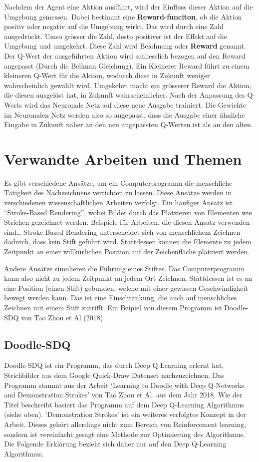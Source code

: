 Nachdem der Agent eine Aktion ausführt, wird der Einfluss dieser Aktion auf die
Umgebung gemessen. Dabei bestimmt eine \textbf{Reward-funciton}, ob die Aktion
positiv oder negativ auf die Umgebung wirkt. Das wird durch eine Zahl
ausgedrückt. Umso grösser die Zahl, desto positiver ist der Effekt auf die
Umgebung und umgekehrt. Diese Zahl wird Belohnung oder \textbf{Reward} genannt.
Der Q-Wert der ausgeführten Aktion wird schliesslich bezogen auf den Reward
angepasst (Durch die Bellman Gleichung). Ein Kleinerer Reward führt zu einem
kleineren Q-Wert für die Aktion, wodurch diese in Zukunft weniger wahrscheinlich
gewählt wird. Umgekehrt macht ein grösserer Reward die Aktion, die diesen
ausgelöst hat, in Zukunft wahrscheinlicher. Nach der Anpassung des Q-Werts wird
das Neuronale Netz auf diese neue Ausgabe trainiert. Die Gewichte im Neuronalen
Netz werden also so angepasst, dass die Ausgabe einer ähnliche Eingabe in
Zukunft näher an den neu angepassten Q-Werten ist als an den alten.

\section{Verwandte Arbeiten und Themen}
\label{chap:t_verwandt}
Es gibt verschiedene Ansätze, um ein Computerprogramm die menschliche Tätigkeit
des Nachzeichnens verrichten zu lassen. Diese Ansätze werden in verschiedenen
wissenschaftlichen Arbeiten verfolgt. Ein häufiger Ansatz ist ``Stroke-Based
Rendering'', wobei Bilder durch das Platzieren von Elementen wie Strichen
gezeichnet werden. Beispiele für Arbeiten, die diesen Ansatz verwenden sind\dots
Stroke-Based Rendering unterscheidet sich von menschlichem Zeichnen dadurch,
dass kein Stift geführt wird. Stattdessen können die Elemente zu jedem Zeitpunkt
an einer willkürlichen Position auf der Zeichenfläche platziert werden.

Andere Ansätze simulieren die Führung eines Stiftes. Das Computerprogramm kann
also nicht zu jedem Zeitpunkt an jedem Ort Zeichnen. Stattdessen ist es an eine
Position (einen Stift) gebunden, welche mit einer gewissen Geschwindigkeit
bewegt werden kann. Das ist eine Einschränkung, die auch auf menschliches
Zeichnen mit einem Stift zutrifft. Ein Beipiel von diesem Programm ist Doodle-SDQ von Tao Zhou et Al (2018)

\subsection*{Doodle-SDQ}
Doodle-SDQ ist ein Programm, das durch Deep Q Learning erlernt hat, Strichbilder
aus dem Google Quick-Draw Datenset nachzuzeichnen. Das Programm stammt aus der
Arbeit `Learning to Doodle with Deep Q-Networks and Demonstration Strokes' von
Tao Zhou et Al. aus dem Jahr 2018. Wie der Titel beschreibt basiert das Programm
auf dem Deep Q-Learning Algorithmus (siehe oben). `Demonstration Strokes' ist
ein weiteres verfolgtes Konzept in der Arbeit. Dieses gehört allerdings nicht
zum Bereich von Reinforcement learning, sondern ist vereinfacht gesagt eine
Methode zur Optimierung des Algorithmus. Die Folgende Erklärung bezieht sich
daher nur auf den Deep Q-Learning Algorithmus.

